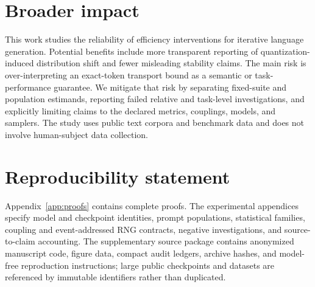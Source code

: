 \documentclass[10pt]{article}
\theoremstyle{plain}
\theoremstyle{definition}
\theoremstyle{remark}
\begin{document}
\section*{Broader impact}
This work studies the reliability of efficiency interventions for iterative language generation. Potential benefits include more transparent reporting of quantization-induced distribution shift and fewer misleading stability claims. The main risk is over-interpreting an exact-token transport bound as a semantic or task-performance guarantee. We mitigate that risk by separating fixed-suite and population estimands, reporting failed relative and task-level investigations, and explicitly limiting claims to the declared metrics, couplings, models, and samplers. The study uses public text corpora and benchmark data and does not involve human-subject data collection.

\section*{Reproducibility statement}
Appendix~\ref{app:proofs} contains complete proofs. The experimental appendices specify model and checkpoint identities, prompt populations, statistical families, coupling and event-addressed RNG contracts, negative investigations, and source-to-claim accounting. The supplementary source package contains anonymized manuscript code, figure data, compact audit ledgers, archive hashes, and model-free reproduction instructions; large public checkpoints and datasets are referenced by immutable identifiers rather than duplicated.

\clearpage


\appendix





\end{document}
